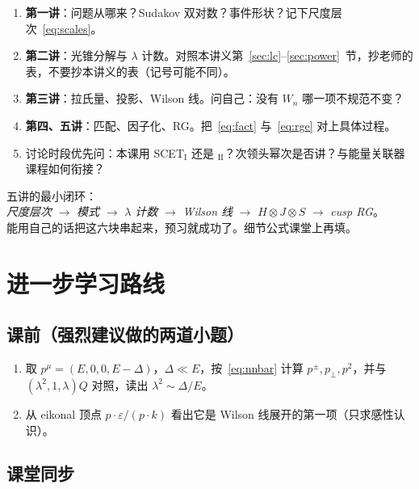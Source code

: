 \documentclass[11pt,a4paper]{article}
\theoremstyle{definition}
\theoremstyle{plain}
\theoremstyle{remark}
\begin{document}
\begin{enumerate}[leftmargin=1.8em]
  \item \textbf{第一讲}：问题从哪来？Sudakov 双对数？事件形状？记下尺度层次~\eqref{eq:scales}。
  \item \textbf{第二讲}：光锥分解与 $\lambda$ 计数。对照本讲义第~\ref{sec:lc}--\ref{sec:power}~节，抄老师的表，不要抄本讲义的表（记号可能不同）。
  \item \textbf{第三讲}：拉氏量、投影、Wilson 线。问自己：没有 $W_n$ 哪一项不规范不变？
  \item \textbf{第四、五讲}：匹配、因子化、RG。把~\eqref{eq:fact} 与~\eqref{eq:rge} 对上具体过程。
  \item 讨论时段优先问：本课用 SCET$_{\mathrm I}$ 还是 ${}_{\mathrm{II}}$？次领头幂次是否讲？与能量关联器课程如何衔接？
\end{enumerate}

\begin{hearbox}
五讲的最小闭环：\\
\emph{尺度层次} $\to$ \emph{模式} $\to$ \emph{$\lambda$ 计数} $\to$ \emph{Wilson 线} $\to$ \emph{$H\otimes J\otimes S$} $\to$ \emph{cusp RG}。\\
能用自己的话把这六块串起来，预习就成功了。细节公式课堂上再填。
\end{hearbox}

\section{进一步学习路线}
\label{sec:next}

\subsection{课前（强烈建议做的两道小题）}

\begin{enumerate}[leftmargin=1.6em]
  \item 取 $p^\mu=(E,0,0,E-\Delta)$，$\Delta\ll E$，按~\eqref{eq:nnbar} 计算 $p^\pm,p_\perp,p^2$，并与 $(\lambda^2,1,\lambda)Q$ 对照，读出 $\lambda^2\sim\Delta/E$。
  \item 从 eikonal 顶点 $p\cdot\varepsilon/(p\cdot k)$ 看出它是 Wilson 线展开的第一项（只求感性认识）。
\end{enumerate}

\subsection{课堂同步}
\end{document}
